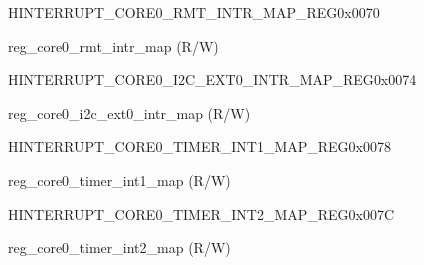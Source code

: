\begin{register}{H}{INTERRUPT\_CORE0\_RMT\_INTR\_MAP\_REG}{0x0070}\label{regdesc:INTERRUPTCORE0RMTINTRMAPREG}
%
%
\regnewline%
\begin{regdesc}\begin{reglist}
\label{fielddesc:INTERRUPTCORE0RMTINTRMAP}\item [INTERRUPT\_CORE0\_RMT\_INTR\_MAP] reg\_core0\_rmt\_intr\_map (R/W)
\end{reglist}\end{regdesc}
\end{register}


\begin{register}{H}{INTERRUPT\_CORE0\_I2C\_EXT0\_INTR\_MAP\_REG}{0x0074}\label{regdesc:INTERRUPTCORE0I2CEXT0INTRMAPREG}
%
%
\regnewline%
\begin{regdesc}\begin{reglist}
\label{fielddesc:INTERRUPTCORE0I2CEXT0INTRMAP}\item [INTERRUPT\_CORE0\_I2C\_EXT0\_INTR\_MAP] reg\_core0\_i2c\_ext0\_intr\_map (R/W)
\end{reglist}\end{regdesc}
\end{register}


\begin{register}{H}{INTERRUPT\_CORE0\_TIMER\_INT1\_MAP\_REG}{0x0078}\label{regdesc:INTERRUPTCORE0TIMERINT1MAPREG}
%
%
\regnewline%
\begin{regdesc}\begin{reglist}
\label{fielddesc:INTERRUPTCORE0TIMERINT1MAP}\item [INTERRUPT\_CORE0\_TIMER\_INT1\_MAP] reg\_core0\_timer\_int1\_map (R/W)
\end{reglist}\end{regdesc}
\end{register}


\begin{register}{H}{INTERRUPT\_CORE0\_TIMER\_INT2\_MAP\_REG}{0x007C}\label{regdesc:INTERRUPTCORE0TIMERINT2MAPREG}
%
%
\regnewline%
\begin{regdesc}\begin{reglist}
\label{fielddesc:INTERRUPTCORE0TIMERINT2MAP}\item [INTERRUPT\_CORE0\_TIMER\_INT2\_MAP] reg\_core0\_timer\_int2\_map (R/W)
\end{reglist}\end{regdesc}
\end{register}



